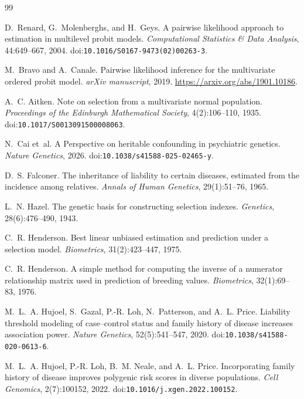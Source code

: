 \documentclass[11pt,a4paper]{article}
\newcommand{\doi}[1]{doi:\allowbreak\texttt{#1}}
\begin{document}
\begin{thebibliography}{99}

D.~Renard, G.~Molenberghs, and H.~Geys.
A pairwise likelihood approach to estimation in multilevel probit models.
\emph{Computational Statistics \& Data Analysis}, 44:649--667, 2004.
\doi{10.1016/S0167-9473(02)00263-3}.

M.~Bravo and A.~Canale.
Pairwise likelihood inference for the multivariate ordered probit model.
\emph{arXiv manuscript}, 2019.
\url{https://arxiv.org/abs/1901.10186}.

A.~C. Aitken.
\newblock Note on selection from a multivariate normal population.
\newblock \emph{Proceedings of the Edinburgh Mathematical Society},
  4(2):106--110, 1935.
\newblock \doi{10.1017/S0013091500008063}.

N.~Cai et~al.
\newblock A Perspective on heritable confounding in psychiatric genetics.
\newblock \emph{Nature Genetics}, 2026.
\newblock \doi{10.1038/s41588-025-02465-y}.

D.~S. Falconer.
\newblock The inheritance of liability to certain diseases, estimated from
  the incidence among relatives.
\newblock \emph{Annals of Human Genetics}, 29(1):51--76, 1965.

L.~N. Hazel.
\newblock The genetic basis for constructing selection indexes.
\newblock \emph{Genetics}, 28(6):476--490, 1943.

C.~R. Henderson.
\newblock Best linear unbiased estimation and prediction under a selection
  model.
\newblock \emph{Biometrics}, 31(2):423--447, 1975.

C.~R. Henderson.
\newblock A simple method for computing the inverse of a numerator
  relationship matrix used in prediction of breeding values.
\newblock \emph{Biometrics}, 32(1):69--83, 1976.

M.~L.~A. Hujoel, S.~Gazal, P.-R. Loh, N.~Patterson, and A.~L. Price.
\newblock Liability threshold modeling of case--control status and family
  history of disease increases association power.
\newblock \emph{Nature Genetics}, 52(5):541--547, 2020.
\newblock \doi{10.1038/s41588-020-0613-6}.

M.~L.~A. Hujoel, P.-R. Loh, B.~M. Neale, and A.~L. Price.
\newblock Incorporating family history of disease improves polygenic risk
  scores in diverse populations.
\newblock \emph{Cell Genomics}, 2(7):100152, 2022.
\newblock \doi{10.1016/j.xgen.2022.100152}.


\end{thebibliography}
\end{document}
